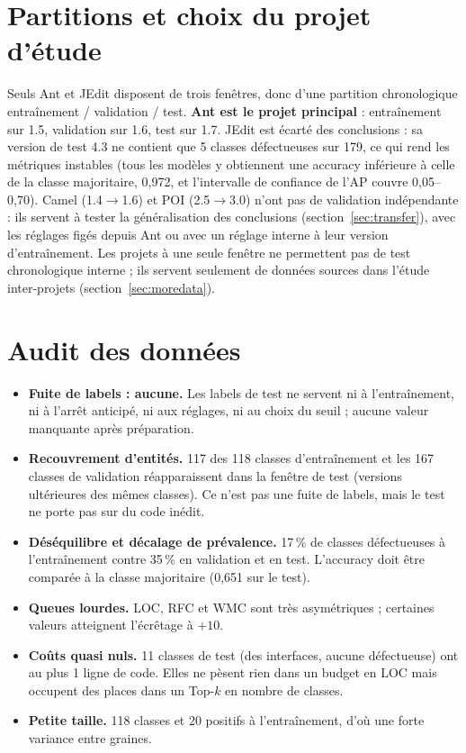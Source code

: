 \documentclass[11pt,a4paper,openany]{report}
\begin{document}
\section{Partitions et choix du projet d'étude}
Seuls Ant et JEdit disposent de trois fenêtres, donc d'une partition chronologique entraînement / validation / test.
\textbf{Ant est le projet principal} : entraînement sur 1.5, validation sur 1.6, test sur 1.7.
JEdit est écarté des conclusions : sa version de test 4.3 ne contient que 5 classes défectueuses sur 179, ce qui rend
les métriques instables (tous les modèles y obtiennent une accuracy inférieure à celle de la classe majoritaire,
0,972, et l'intervalle de confiance de l'AP couvre 0,05--0,70). Camel (1.4$\to$1.6) et POI (2.5$\to$3.0) n'ont pas de
validation indépendante : ils servent à tester la généralisation des conclusions (section~\ref{sec:transfer}), avec
les réglages figés depuis Ant ou avec un réglage interne à leur version d'entraînement. Les projets à une seule
fenêtre ne permettent pas de test chronologique interne ; ils servent seulement de données sources dans l'étude
inter-projets (section~\ref{sec:moredata}).

\section{Audit des données}
\begin{keybox}
\begin{itemize}[leftmargin=1em]
  \item \textbf{Fuite de labels : aucune.} Les labels de test ne servent ni à l'entraînement, ni à l'arrêt anticipé,
        ni aux réglages, ni au choix du seuil ; aucune valeur manquante après préparation.
  \item \textbf{Recouvrement d'entités.} 117 des 118 classes d'entraînement et les 167 classes de validation
        réapparaissent dans la fenêtre de test (versions ultérieures des mêmes classes). Ce n'est pas une fuite de
        labels, mais le test ne porte pas sur du code inédit.
  \item \textbf{Déséquilibre et décalage de prévalence.} 17\,\% de classes défectueuses à l'entraînement contre 35\,\%
        en validation et en test. L'accuracy doit être comparée à la classe majoritaire (0,651 sur le test).
  \item \textbf{Queues lourdes.} LOC, RFC et WMC sont très asymétriques ; certaines valeurs atteignent l'écrêtage à $+10$.
  \item \textbf{Coûts quasi nuls.} 11 classes de test (des interfaces, aucune défectueuse) ont au plus 1 ligne de code.
        Elles ne pèsent rien dans un budget en LOC mais occupent des places dans un Top-$k$ en nombre de classes.
  \item \textbf{Petite taille.} 118 classes et 20 positifs à l'entraînement, d'où une forte variance entre graines.
\end{itemize}
\end{keybox}
\end{document}
